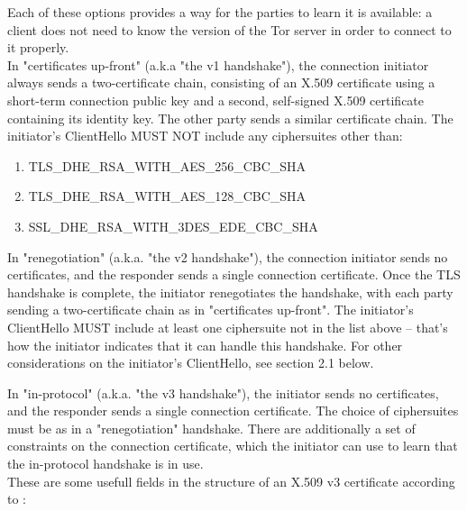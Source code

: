 Each of these options provides a way for the parties to learn it is
   available: a client does not need to know the version of the Tor
   server in order to connect to it properly.
   \\
   
\label{Key:connection-key} In "certificates up-front" (a.k.a "the v1 handshake"), the connection initiator always sends a two-certificate chain, consisting of an X.509 certificate using a short-term connection public key and a second, self-signed X.509 certificate containing its identity key. The other party sends a similar certificate chain. The initiator's ClientHello MUST NOT include any ciphersuites other than:
\begin{enumerate}
	\item TLS\_DHE\_RSA\_WITH\_AES\_256\_CBC\_SHA
	\item TLS\_DHE\_RSA\_WITH\_AES\_128\_CBC\_SHA
	\item SSL\_DHE\_RSA\_WITH\_3DES\_EDE\_CBC\_SHA
\end{enumerate}

In "renegotiation" (a.k.a. "the v2 handshake"), the connection initiator sends no certificates, and the responder sends a single connection certificate.  Once the TLS handshake is complete, the initiator renegotiates the handshake, with each party sending a two-certificate chain as in "certificates up-front". The initiator's ClientHello MUST include at least one ciphersuite not in the list above -- that's how the initiator indicates that it can handle this handshake.  For other considerations on the initiator's ClientHello, see section 2.1 below.

In "in-protocol" (a.k.a. "the v3 handshake"), the initiator sends no certificates, and the responder sends a single connection certificate.  The choice of ciphersuites must be as in a "renegotiation" handshake.  There are additionally a set of constraints on the connection certificate, which the initiator can use to learn that the in-protocol handshake is in use.
\\
These are some usefull fields in the structure of an X.509 v3 
certificate according to \cite{crl_rfc}:

